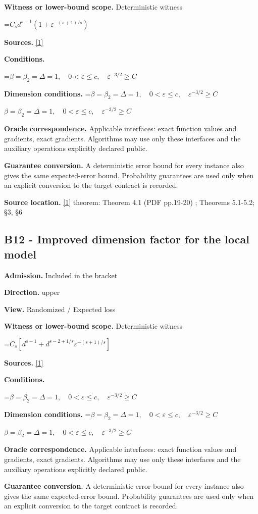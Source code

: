 \documentclass[10pt,a4paper]{article}
\newcommand{\AtlasMath}[1]{\par\begingroup\centering\setbox0=\hbox{$\displaystyle #1$}\ifdim\wd0>1.4\linewidth\typeout{ATLAS WIDE FORMULA: \the\wd0}\fi\ifdim\wd0>\linewidth\resizebox{\linewidth}{!}{\box0}\else\box0\fi\par\endgroup}
\newcommand{\AtlasInlineMath}[1]{\begingroup\setbox0=\hbox{$#1$}\ifdim\wd0>.4\linewidth\endgroup\AtlasMath{#1}\else\endgroup$#1$\fi}
\begin{document}
\textbf{Witness or lower-bound scope.} Deterministic witness

\AtlasMath{C_s d^{s-1}(1+\varepsilon^{-(s+1)/s})}
\textbf{Sources.} \href{https://arxiv.org/pdf/2610.02791}{[1]}

\textbf{Conditions.} 
\AtlasMath{\beta=\beta_2=\Delta=1,\quad0<\varepsilon\le c,\quad\varepsilon^{-3/2}\ge C}


\textbf{Dimension conditions.} \AtlasInlineMath{\beta=\beta_2=\Delta=1,\quad0<\varepsilon\le c,\quad\varepsilon^{-3/2}\ge C}

\textbf{Oracle correspondence.} Applicable interfaces: exact function values and gradients, exact gradients. Algorithms may use only these interfaces and the auxiliary operations explicitly declared public.

\textbf{Guarantee conversion.} A deterministic error bound for every instance also gives the same expected-error bound. Probability guarantees are used only when an explicit conversion to the target contract is recorded.

\textbf{Source location.} \href{https://arxiv.org/pdf/2610.02791}{[1]} theorem: Theorem 4.1 (PDF pp.19-20) ; Theorems 5.1-5.2; §3, §6

\subsection{B12 - Improved dimension factor for the local model}
\textbf{Admission.} Included in the bracket

\textbf{Direction.} upper

\textbf{View.} Randomized / Expected loss

\textbf{Witness or lower-bound scope.} Deterministic witness

\AtlasMath{C_s[d^{s-1}+d^{s-2+1/s}\varepsilon^{-(s+1)/s}]}
\textbf{Sources.} \href{https://arxiv.org/pdf/2610.02791}{[1]}

\textbf{Conditions.} 
\AtlasMath{\beta=\beta_2=\Delta=1,\quad0<\varepsilon\le c,\quad\varepsilon^{-3/2}\ge C}


\textbf{Dimension conditions.} \AtlasInlineMath{\beta=\beta_2=\Delta=1,\quad0<\varepsilon\le c,\quad\varepsilon^{-3/2}\ge C}

\textbf{Oracle correspondence.} Applicable interfaces: exact function values and gradients, exact gradients. Algorithms may use only these interfaces and the auxiliary operations explicitly declared public.

\textbf{Guarantee conversion.} A deterministic error bound for every instance also gives the same expected-error bound. Probability guarantees are used only when an explicit conversion to the target contract is recorded.
\end{document}
